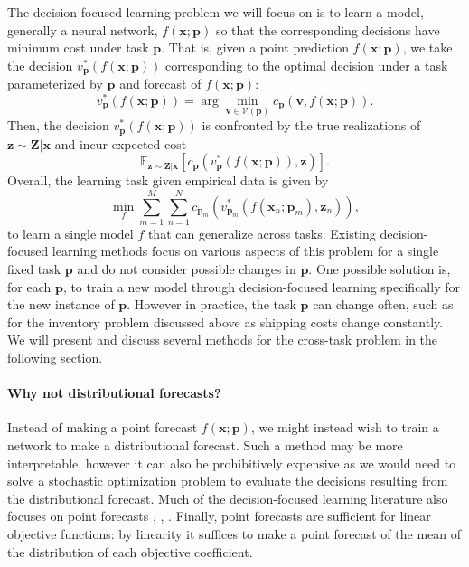 \documentclass{article}
\newcommand{\p}[0]{\mathbf{p}}
\newcommand{\x}[0]{\mathbf{x}}
\renewcommand{\v}[0]{\mathbf{v}}
\newcommand{\z}[0]{\mathbf{z}}
\newcommand{\Z}[0]{\mathbf{Z}}
\newcommand{\E}[0]{\mathbb{E}}
\newcommand{\V}[0]{\mathcal{V}}
\theoremstyle{plain}
\theoremstyle{definition}
\theoremstyle{remark}
\newtheorem{remark}[theorem]{Remark}
\begin{document}
The decision-focused learning problem we will focus on is to learn a model, generally a neural network, $f(\x; \p)$ so that the corresponding decisions have minimum cost under task $\p$. That is, given a point prediction $f(\x; \p)$, we take the decision $v^*_{\p}(f(\x; \p))$ corresponding to the optimal decision under a task parameterized by $\p$ and forecast of $f(\x; \p)$:
\begin{equation}
    v^*_{\p}(f(\x; \p)) = \arg\min_{\v \in \V(\p)} c_{\p}(\v, f(\x; \p)).
\end{equation}
Then, the decision $v^*_{\p}(f(\x; \p))$ is confronted by the true realizations of $\z \sim \Z|\x$ and incur expected cost 
\begin{equation}
    \E_{\z \sim \Z|\x} \left[ c_{\p}(v^*_{\p}(f(\x;\p)), \z) \right].
\end{equation}
Overall, the learning task given empirical data is given by
\begin{equation}
    \min_{f} \sum_{m=1}^M \sum_{n=1}^N c_{\p_m}(v^*_{\p_m}(f(\x_n; \p_m), \z_n)),
\end{equation}
to learn a single model $f$ that can generalize across tasks. Existing decision-focused learning methods focus on various aspects of this problem for a single fixed task $\p$ and do not consider possible changes in $\p$. One possible solution is, for each $\p$, to train a new model through decision-focused learning specifically for the new instance of $\p$. However in practice, the task $\p$ can change often, such as for the inventory problem discussed above as shipping costs change constantly. We will present and discuss several methods for the cross-task problem in the following section.

\paragraph{Why not distributional forecasts?} Instead of making a point forecast $f(\x; \p)$, we might instead wish to train a network to make a distributional forecast. Such a method may be more interpretable, however it can also be prohibitively expensive as we would need to solve a stochastic optimization problem to evaluate the decisions resulting from the distributional forecast. Much of the decision-focused learning literature also focuses on point forecasts \cite{}, \cite{}, \cite{}. Finally, point forecasts are sufficient for linear objective functions: by linearity it suffices to make a point forecast of the mean of the distribution of each objective coefficient.
\end{document}
